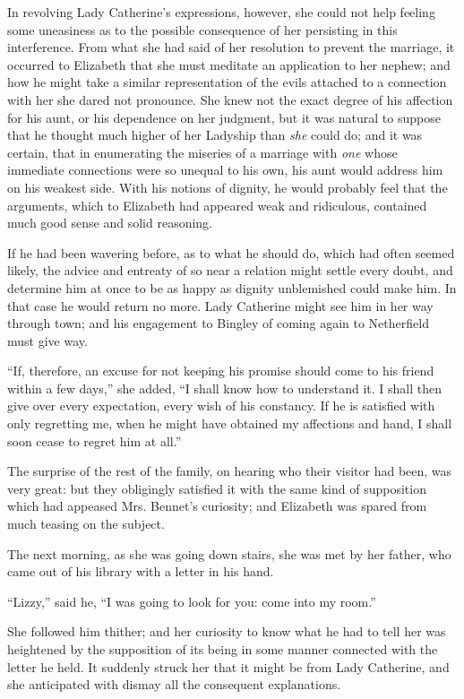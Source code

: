In revolving Lady Catherine's expressions, however, she could not help feeling some uneasiness as to the possible consequence of her persisting in this interference. From what she had said of her resolution to prevent the marriage, it occurred to Elizabeth that she must meditate an application to her nephew; and how he might take a similar representation of the evils attached to a connection with her she dared not pronounce. She knew not the exact degree of his affection for his aunt, or his dependence on her judgment, but it was natural to suppose that he thought much higher of her Ladyship than \textit{she} could do; and it was certain, that in enumerating the miseries of a marriage with \textit{one} whose immediate connections were so unequal to his own, his aunt would address him on his weakest side. With his notions of dignity, he would probably feel that the arguments, which to Elizabeth had appeared weak and ridiculous, contained much good sense and solid reasoning.

If he had been wavering before, as to what he should do, which had often seemed likely, the advice and entreaty of so near a relation might settle every doubt, and determine him at once to be as happy as dignity unblemished could make him. In that case he would return no more. Lady Catherine might see him in her way through town; and his engagement to Bingley of coming again to Netherfield must give way.

``If, therefore, an excuse for not keeping his promise should come to his friend within a few days,'' she added, ``I shall know how to understand it. I shall then give over every expectation, every wish of his constancy. If he is satisfied with only regretting me, when he might have obtained my affections and hand, I shall soon cease to regret him at all.''

The surprise of the rest of the family, on hearing who their visitor had been, was very great: but they obligingly satisfied it with the same kind of supposition which had appeased Mrs. Bennet's curiosity; and Elizabeth was spared from much teasing on the subject.

The next morning, as she was going down stairs, she was met by her father, who came out of his library with a letter in his hand.

``Lizzy,'' said he, ``I was going to look for you: come into my room.''

She followed him thither; and her curiosity to know what he had to tell her was heightened by the supposition of its being in some manner connected with the letter he held. It suddenly struck her that it might be from Lady Catherine, and she anticipated with dismay all the consequent explanations.

